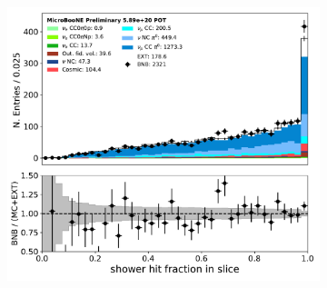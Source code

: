 \begin{figure}[H]
\begin{center}
\begin{subfigure}[b]{0.3\textwidth}
    \caption{}
    \end{subfigure}
    \begin{subfigure}[b]{0.3\textwidth}
    \centering
    \includegraphics[width=1.00\textwidth]{pi0/nueselection/hits_ratio_03112020_ALL_scaled.pdf}
    \caption{}
    \end{subfigure}
\caption{}
\label{fig:pi0:nueselection:trkvar2}
\end{center}
\end{figure}

